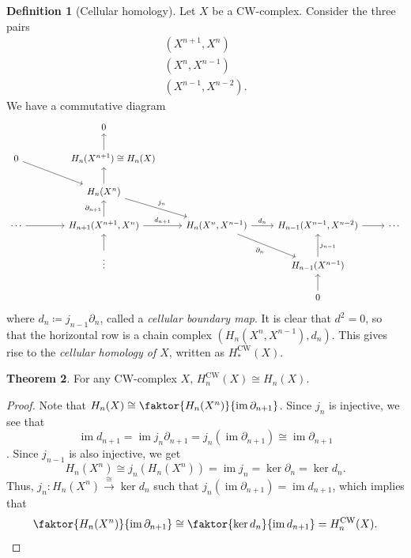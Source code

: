 \documentclass[10pt,letterpaper,cm]{nupset}
\theoremstyle{definition}
\newtheorem{definition}{Definition}[subsection]
\theoremstyle{theorem}
\newtheorem{theorem}[definition]{Theorem}
\theoremstyle{remark}
\newcommand{\1}{\mathbb{1}}
\newcommand{\0}{\vec 0}
\newcommand{\cw}{\mathrm{CW}}
\DeclareMathOperator{\im}{im}
\begin{document}
\begin{definition}[Cellular homology]
Let $X$ be a CW-complex. Consider the three pairs 
\begin{gather*}
\left(X^{n+1}, X^n\right)
\\ \left(X^n, X^{n-1}\right)
\\ \left(X^{n-1}, X^{n-2}\right).
\end{gather*} We have a commutative diagram
\[
\begin{tikzcd}
                 & 0                                                                        &                                                                &                                        &        \\
0 \arrow[rd]     & {\quad \quad H_n(X^{n+1})\cong H_n(X)} \arrow[u]                                       &                                                                &                                        &        \\
                 & H_n(X^n) \arrow[rd, "j_n"] \arrow[u]                                     &                                                                &                                        &        \\
\cdots \arrow[r] & {H_{n+1}(X^{n+1}, X^n)} \arrow[r, "d_{n+1}"] \arrow[u, "\partial_{n+1}"] & {H_n(X^n, X^{n-1})} \arrow[rd, "\partial_n"'] \arrow[r, "d_n"] & {H_{n-1}(X^{n-1}, X^{n-2})} \arrow[r]  & \cdots \\
                 & \vdots \arrow[u]                                                         &                                                                & H_{n-1}(X^{n-1}) \arrow[u, "j_{n-1}"'] &        \\
                 &                                                                          &                                                                & 0 \arrow[u]                            &       
\end{tikzcd}
\] where $d_n \coloneqq  j_{n-1}{\partial_n}$, called a \textit{cellular boundary map}. It is clear that $d^2 =0$, so that the horizontal row is a chain complex $\left(H_n(X^n, X^{n-1}), d_n\right)$. This gives rise to the \textit{cellular homology of $X$}, written as $H_{\ast}^{\cw}(X)$.
\end{definition}

\begin{theorem}
For any CW-complex $X$, $H_n^{\cw}(X) \cong H_n(X)$.
\end{theorem}
\begin{proof}
Note that $H_n(X) \cong \faktor{H_n(X^n)}{\im{\partial_{n+1}}}$. Since $j_n$ is injective, we see that $$\im{d_{n+1}} = \im{j_n{\partial_{n+1}}} = j_n(\im{\partial_{n+1}}) \cong \im{\partial_{n+1}}$$. Since $j_{n-1}$ is also injective, we get $$H_n(X^n) \cong j_n(H_n(X^n)) = \im{j_n} = \ker{\partial_n} = \ker{d_n}.$$ Thus, $j_n : H_n(X^n) \overset{\cong}{\longrightarrow} \ker{d_n}$ such that $j_n(\im{\partial_{n+1}}) = \im{d_{n+1}}$, which implies that $$ \faktor{H_n(X^n)}{\im{\partial_{n+1}}} \cong \faktor{\ker{d_n}}{\im{d_{n+1}}} = H_n^{\cw}(X).$$
\end{proof}
\end{document}
